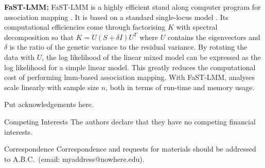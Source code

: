 \documentclass{nature}
\begin{document}
\textbf{FaST-LMM:}  FaST-LMM is a highly efficient stand along computer program for association 
mapping \cite{lippert2011fast}. It is based on a standard single-locus model 
\cite{yu2006unified,zhao2007arabidopsis}. Its computational efficiencies come through factorising $K$ with spectral decomposition so that $K=U (S + \delta I) U^T$ where $U$ contains the eigenvectors and $\delta$ is the ratio of the genetic variance to the residual variance. 
By rotating the data with $U$, the log likelihood of the linear mixed model can be expressed as the log likelihood for a simple 
linear model.  This greatly reduces the computational cost of performing lmm-based  association mapping. With FaST-LMM, 
analyses scale linearly with sample size $n$, both in terms of run-time and memory usage.
















\begin{addendum}
 \item Put acknowledgements here.
 \item[Competing Interests] The authors declare that they have no
competing financial interests.
 \item[Correspondence] Correspondence and requests for materials
should be addressed to A.B.C.~(email: myaddress@nowhere.edu).
\end{addendum}
\end{document}
